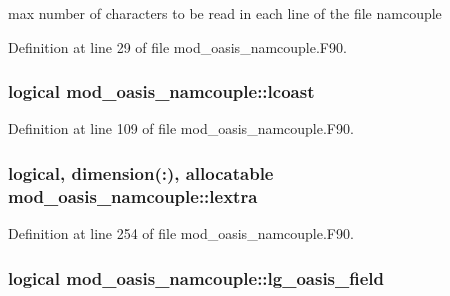 max number of characters to be read in each line of the file namcouple 



Definition at line 29 of file mod\+\_\+oasis\+\_\+namcouple.\+F90.

\hypertarget{classmod__oasis__namcouple_a7657e0f9b495e291f26dc31b4f6145aa}{
\subsubsection[{lcoast}]{\setlength{\rightskip}{0pt plus 5cm}logical mod\+\_\+oasis\+\_\+namcouple\+::lcoast\hspace{0.3cm}{\ttfamily [private]}}}\label{classmod__oasis__namcouple_a7657e0f9b495e291f26dc31b4f6145aa}


Definition at line 109 of file mod\+\_\+oasis\+\_\+namcouple.\+F90.

\hypertarget{classmod__oasis__namcouple_a2febd0d97dea9ecc3ce4a8c5088a8d1f}{
\subsubsection[{lextra}]{\setlength{\rightskip}{0pt plus 5cm}logical, dimension(\+:), allocatable mod\+\_\+oasis\+\_\+namcouple\+::lextra\hspace{0.3cm}{\ttfamily [private]}}}\label{classmod__oasis__namcouple_a2febd0d97dea9ecc3ce4a8c5088a8d1f}


Definition at line 254 of file mod\+\_\+oasis\+\_\+namcouple.\+F90.

\hypertarget{classmod__oasis__namcouple_aaf6b923ffc7763fd37a5c4c72bdfa34d}{
\subsubsection[{lg\+\_\+oasis\+\_\+field}]{\setlength{\rightskip}{0pt plus 5cm}logical mod\+\_\+oasis\+\_\+namcouple\+::lg\+\_\+oasis\+\_\+field\hspace{0.3cm}{\ttfamily [private]}}}\label{classmod__oasis__namcouple_aaf6b923ffc7763fd37a5c4c72bdfa34d}


